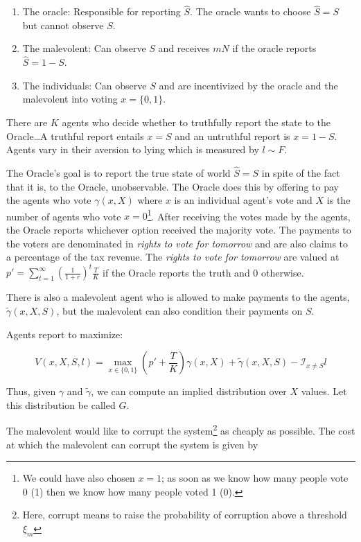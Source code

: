 \documentclass[12pt]{article}
\begin{document}
  \begin{enumerate}
    \item The oracle: Responsible for reporting $\hat{S}$. The oracle wants to choose $\hat{S} = S$
    but cannot observe $S$.
    \item The malevolent: Can observe $S$ and receives $mN$ if the oracle reports $\hat{S} = 1 - S$.
    \item The individuals: Can observe $S$ and are incentivized by the oracle and the malevolent
    into voting $x = \{0, 1\}$.
  \end{enumerate}

  There are $K$ agents who decide whether to truthfully report the state to the Oracle\dots A truthful
  report entails $x = S$ and an untruthful report is $x = 1 - S$. Agents vary in their aversion to
  lying which is measured by $l \sim F$.

  The Oracle's goal is to report the true state of world $\hat{S} = S$ in spite of the fact that it
  is, to the Oracle, unobservable. The Oracle does this by offering to pay the agents who vote
  $\gamma(x, X)$ where $x$ is an individual agent's vote and $X$ is the number of agents who vote
  $x=0$\footnote{ We could have also chosen $x=1$; as soon as we know how many people vote 0 (1)
  then we know how many people voted 1 (0).}. After receiving the votes made by the agents, the
  Oracle reports whichever option received the majority vote. The payments to the voters are
  denominated in \textit{rights to vote for tomorrow} and are also claims to a percentage of the tax
  revenue. The \textit{rights to vote for tomorrow} are valued at
  $p' = \sum_{t=1}^\infty \left(\frac{1}{1+r} \right)^t \frac{T}{K}$
  if the Oracle reports the truth and 0 otherwise.

  There is also a malevolent agent who is allowed to make payments to the agents,
  $\tilde{\gamma}(x, X, S)$, but the malevolent can also condition their payments on $S$.

  Agents report to maximize:

  $$V(x, X, S, l) = \max_{x \in \{0, 1\}} (p' + \frac{T}{K}) \gamma(x, X) + \tilde{\gamma}(x, X, S) - \mathcal{I}_{x \neq S} l$$

  Thus, given $\gamma$ and $\tilde{\gamma}$, we can compute an implied distribution over $X$ values.
  Let this distribution be called $G$.

  The malevolent would like to corrupt the system\footnote{Here, corrupt means to raise the
  probability of corruption above a threshold $\xi_m$} as cheaply as possible. The cost at which the
  malevolent can corrupt the system is given by
\end{document}
